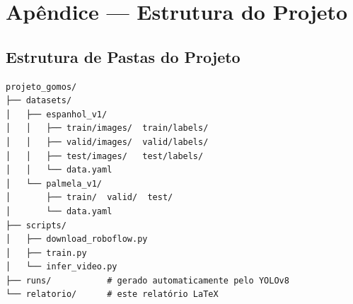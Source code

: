 \chapter{Apêndice — Estrutura do Projeto}
\label{ap:scripts}

\section{Estrutura de Pastas do Projeto}

\begin{lstlisting}[caption={Estrutura de pastas recomendada}]
projeto_gomos/
├── datasets/
│   ├── espanhol_v1/
│   │   ├── train/images/  train/labels/
│   │   ├── valid/images/  valid/labels/
│   │   ├── test/images/   test/labels/
│   │   └── data.yaml
│   └── palmela_v1/
│       ├── train/  valid/  test/
│       └── data.yaml
├── scripts/
│   ├── download_roboflow.py
│   ├── train.py
│   └── infer_video.py
├── runs/           # gerado automaticamente pelo YOLOv8
└── relatorio/      # este relatório LaTeX
\end{lstlisting}
